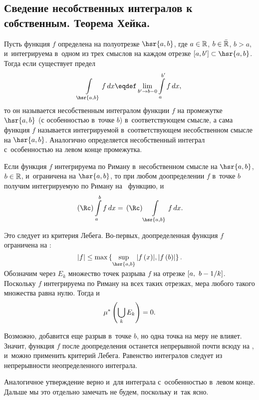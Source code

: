 \documentclass[draft]{article}
\begin{document}


\subsection{Сведение несобственных интегралов к собственным. Теорема Хейка.}

\df Пусть функция $f$ определена на полуотрезке $\hsr{a, b}$, где
$a\in\mathbb{R}$, $b\in\bar{\mathbb{R}}$, $b>a$, и~интегрируема в~одном из
трех смыслов на каждом отрезке $\seg[a,b']\subset\hsr{a, b}$. Тогда
если существует предел
$$\int\limits_{\hsr{a,b}}   f\,dx\eqdef\lim_{b'\rightarrow b-0}\intd[a,b']f,x,$$
то он называется несобственным интегралом функции $f$ на промежутке
$\hsr{a, b}$ (с особенностью в~точке $b$) в~соответствующем смысле,
а сама функция $f$ называется интегрируемой в~соответствующем
несобственном смысле на $\hsr{a, b}$. Аналогично определяется
несобственный интеграл с~особенностью на левом конце промежутка.

\bigskip

\ut

Если функция $f$ интегрируема по Риману в~несобственном смысле на
$\hsr{a, b}$, $b\in\mathbb{R}$, и~ограничена на $\hsr{a, b}$, то при
любом доопределении $f$ в~точке $b$ получим интегрируемую по Риману
на \ab\ функцию, и
$$\riman\intabfdx=\riman \int\limits_{\hsr{a,b}}   f\,dx.$$

\pr

Это следует из критерия Лебега. Во-первых, доопределенная функция
$f$ ограничена на \ab:
$$\abs{f}\le\max\set{\smash{\sup_{\hsr{a,b}}\abs{f\at(x)}},\abs{f\at(b)}}.$$

Обозначим через $E_k$ множество точек разрыва $f$ на отрезке
$\seg[a,\ b-1/k]$. Поскольку $f$ интегрируема по Риману на всех
таких отрезках, мера любого такого множества равна нулю. Тогда и
$$\mes\at(\bigcup_kE_k)=0.$$

Возможно, добавится еще разрыв в~точке $b$, но одна точка на меру не
влияет. Значит, функция $f$ после доопределения останется
непрерывной почти всюду на \ab, и~можно применить критерий Лебега.
Равенство интегралов следует из непрерывности неопределенного
интеграла.

\prut

\bigskip

{\small\rem

Аналогичное утверждение верно и~для интеграла с~особенностью в~левом
конце. Дальше мы это отдельно замечать не будем, поскольку и~так
ясно.

}
\end{document}
